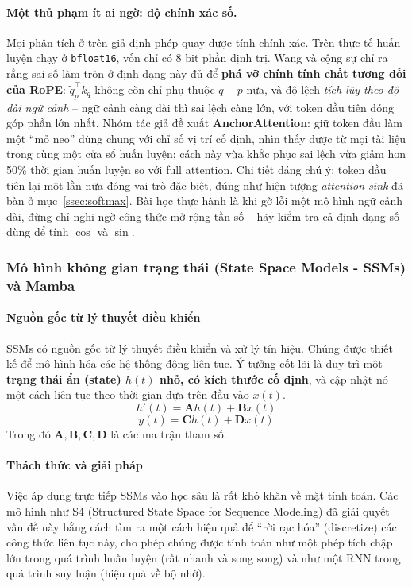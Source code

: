 \paragraph{Một thủ phạm ít ai ngờ: độ chính xác số.} Mọi phân tích ở trên giả định phép quay được tính chính xác. Trên thực tế huấn luyện chạy ở \texttt{bfloat16}, vốn chỉ có 8 bit phần định trị. Wang và cộng sự \cite{wang2024bfloat16rope} chỉ ra rằng sai số làm tròn ở định dạng này đủ để \textbf{phá vỡ chính tính chất tương đối của RoPE}: $\tilde{q}_p^\top \tilde{k}_q$ không còn chỉ phụ thuộc $q - p$ nữa, và độ lệch \emph{tích lũy theo độ dài ngữ cảnh} -- ngữ cảnh càng dài thì sai lệch càng lớn, với token đầu tiên đóng góp phần lớn nhất. Nhóm tác giả đề xuất \textbf{AnchorAttention}: giữ token đầu làm một “mỏ neo” dùng chung với chỉ số vị trí cố định, nhìn thấy được từ mọi tài liệu trong cùng một cửa sổ huấn luyện; cách này vừa khắc phục sai lệch vừa giảm hơn 50\% thời gian huấn luyện so với full attention. Chi tiết đáng chú ý: token đầu tiên lại một lần nữa đóng vai trò đặc biệt, đúng như hiện tượng \emph{attention sink} đã bàn ở mục~\ref{ssec:softmax}. Bài học thực hành là khi gỡ lỗi một mô hình ngữ cảnh dài, đừng chỉ nghi ngờ công thức mở rộng tần số -- hãy kiểm tra cả định dạng số dùng để tính $\cos$ và $\sin$.


\subsubsection{Mô hình không gian trạng thái (State Space Models - SSMs) và Mamba}
\paragraph{Nguồn gốc từ lý thuyết điều khiển}
SSMs có nguồn gốc từ lý thuyết điều khiển và xử lý tín hiệu. Chúng được thiết kế để mô hình hóa các hệ thống động liên tục. Ý tưởng cốt lõi là duy trì một \textbf{trạng thái ẩn (state) $h(t)$ nhỏ, có kích thước cố định}, và cập nhật nó một cách liên tục theo thời gian dựa trên đầu vào $x(t)$.
$$ h'(t) = \mathbf{A}h(t) + \mathbf{B}x(t) $$
$$ y(t) = \mathbf{C}h(t) + \mathbf{D}x(t) $$
Trong đó $\mathbf{A, B, C, D}$ là các ma trận tham số.

\paragraph{Thách thức và giải pháp}
Việc áp dụng trực tiếp SSMs vào học sâu là rất khó khăn về mặt tính toán. Các mô hình như S4 (Structured State Space for Sequence Modeling) \cite{gu2021efficiently} đã giải quyết vấn đề này bằng cách tìm ra một cách hiệu quả để “rời rạc hóa” (discretize) các công thức liên tục này, cho phép chúng được tính toán như một phép tích chập lớn trong quá trình huấn luyện (rất nhanh và song song) và như một RNN trong quá trình suy luận (hiệu quả về bộ nhớ).

